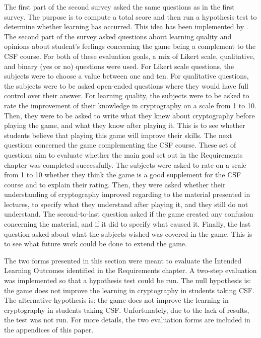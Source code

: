 \documentclass{l4proj}
\begin{document}
The first part of the second survey asked the same questions as in the first survey.
The purpose is to compute a total score and then run a hypothesis test to determine whether learning has occurred.
This idea has been implemented by \citet{su_mobile_2015}.
The second part of the survey asked questions about learning quality 
and opinions about student's feelings concerning the game being a complement to the CSF course.
For both of these evaluation goals, a mix of Likert scale, qualitative, and binary (yes or no) questions were used.
For Likert scale questions, the subjects were to choose a value between one and ten.
For qualitative questions, the subjects were to be asked open-ended questions 
where they would have full control over their answer.
For learning quality, the subjects were to be asked to rate the improvement of their knowledge in cryptography
on a scale from 1 to 10. Then, they were to be asked to write what they knew about cryptography before playing the game, 
and what they know after playing it. This is to see whether students believe that playing this game will improve their skills.
The next questions concerned the game complementing the CSF course.
These set of questions aim to evaluate whether the main goal set out in the Requirements chapter was completed successfully. 
The subjects were asked to rate on a scale from 1 to 10 whether they think the game is a good supplement for the CSF course 
and to explain their rating.
Then, they were asked whether their understanding of cryptography improved regarding to the material presented in lectures, 
to specify what they understand after playing it, and they still do not understand.
The second-to-last question asked if the game created any confusion concerning the material, 
and if it did to specify what caused it.
Finally, the last question asked about what the subjects wished was covered in the game.
This is to see what future work could be done to extend the game.

The two forms presented in this section were meant to evaluate the Intended Learning Outcomes identified in the Requirements chapter.
A two-step evaluation was implemented so that a hypothesis test could be run.
The null hypothesis is: the game does not improve the learning in cryptography in students taking CSF.
The alternative hypothesis is: the game does not improve the learning in cryptography in students taking CSF.
Unfortunately, due to the lack of results, the test was not run.
For more details, the two evaluation forms are included in the appendices of this paper.
\end{document}

